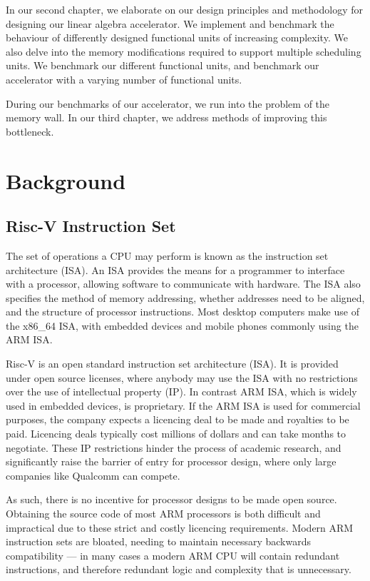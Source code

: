 \documentclass[a4paper,8pt]{report}
\begin{document}
In our second chapter, we elaborate on our design principles and methodology for
designing our linear algebra accelerator. We implement and benchmark the behaviour
of differently designed functional units of increasing complexity. We also delve
into the memory modifications required to support multiple scheduling units. We
benchmark our different functional units, and benchmark our accelerator with a
varying number of functional units.

During our benchmarks of our accelerator, we run into the problem of the memory
wall. In our third chapter, we address methods of improving this
bottleneck.


\chapter{Background}
\section{Risc-V Instruction Set}
The set of operations a CPU may perform is known as the instruction set
architecture (ISA). An ISA provides the means for a
programmer to interface with a processor, allowing software to communicate with
hardware. The ISA also specifies the method of memory addressing, whether
addresses need to be aligned, and the structure of processor instructions. Most
desktop computers make use of the x86\_64 ISA, with embedded devices and mobile
phones commonly using the ARM ISA.


Risc-V is an open standard instruction set architecture (ISA). It is provided
under open source licenses, where anybody may use the ISA with no restrictions
over the use of intellectual property (IP). In contrast ARM ISA, which is widely
used in embedded devices, is proprietary. If the ARM ISA is used
for commercial purposes, the company expects a licencing deal to be made and
royalties to be paid. Licencing deals typically cost millions of dollars and can
take months to negotiate. These IP restrictions hinder the process of academic
research, and significantly raise the barrier of entry for processor design,
where only large companies like Qualcomm can compete.

As such, there is no incentive for processor designs to be made open source.
Obtaining the source code of most ARM processors is both difficult and
impractical due to these strict and costly licencing requirements. Modern ARM
instruction sets are bloated, needing to maintain necessary backwards
compatibility --- in many cases a modern ARM CPU will contain redundant
instructions, and therefore redundant logic and complexity that is unnecessary.
\end{document}

